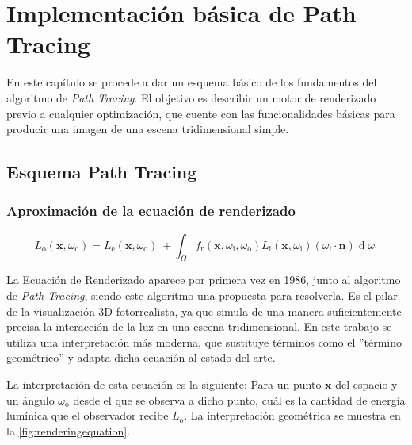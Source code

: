\chapter{Implementación básica de Path Tracing}
\label{chap:2}

En este capítulo se procede a dar un esquema básico de los fundamentos del algoritmo de \emph{Path Tracing}. El objetivo es describir un motor de renderizado previo a cualquier optimización, que cuente con las funcionalidades básicas para producir una imagen de una escena tridimensional simple.


\section{Esquema Path Tracing}
\label{pathtracingexplanation}


	\subsection{Aproximación de la ecuación de renderizado}
\[
{\displaystyle L_{\text{o}}(\mathbf {x} ,\omega _{\text{o}})=L_{\text{e}}(\mathbf {x} ,\omega _{\text{o}})\ +\int _{\Omega }f_{\text{r}}(\mathbf {x} ,\omega _{\text{i}},\omega _{\text{o}})L_{\text{i}}(\mathbf {x} ,\omega _{\text{i}})(\omega _{\text{i}}\cdot \mathbf {n} )\operatorname {d} \omega _{\text{i}}}
\]

La Ecuación de Renderizado \cite{kajiya1986rendering} aparece por primera vez en 1986, junto al algoritmo de \emph{Path Tracing}, siendo este algoritmo una propuesta para resolverla. Es el pilar de la visualización 3D fotorrealista, ya que simula de una manera suficientemente precisa la interacción de la luz en una escena tridimensional. En este trabajo se utiliza una interpretación más moderna, que sustituye términos como el ''término geométrico'' y adapta dicha ecuación al estado del arte.

La interpretación de esta ecuación es la siguiente: Para un punto $\mathbf {x}$ del espacio y un ángulo $\omega _{\text{o}}$ desde el que se observa a dicho punto, cuál es la cantidad de energía lumínica que el observador recibe $L_{\text{o}}$. La interpretación geométrica se muestra en la \autoref{fig:renderingequation}.\linebreak 



